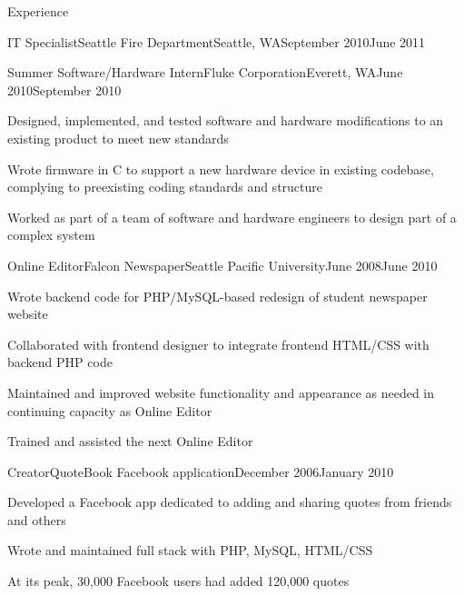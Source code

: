 \documentclass[letterpaper,10pt]{article}
\newcommand{\optarg}[2][]{%
  \ifthenelse{\isempty{#1}}%
    {}%
    {#2}%
}
\newenvironment{res_section}[1]{%
  \vskip 6pt
  \noindent
  {\Large \textbf{#1}}\\
  \rule[8pt]{\textwidth}{0.5pt}
  \vskip -8pt
}{
}
\newenvironment{res_subsection}[1]{%
  \vskip 4pt
  \noindent
  \textbf{\large{#1}}
  \begin{itemize}
}{
  \end{itemize}
}
\newenvironment{res_experienceitem}[5]{%
  \begin{res_subsection}{#1 - \em{%
  #2%
  \optarg[#3]{, #3}%
  \optarg[#4]{, #4}%
  \optarg[#5]{ -- #5}%
  }}
}{
  \end{res_subsection}
}
\begin{document}
\begin{res_section}{Experience}
\begin{res_experienceitem}{IT Specialist}{Seattle Fire Department}{Seattle, WA}{September 2010}{June 2011}
\end{res_experienceitem}
\begin{res_experienceitem}{Summer Software/Hardware Intern}{Fluke Corporation}{Everett, WA}{June 2010}{September 2010}
  \item Designed, implemented, and tested software and hardware modifications to an existing product to meet new standards
  \item Wrote firmware in C to support a new hardware device in existing codebase, complying to preexisting coding standards and structure
  \item Worked as part of a team of software and hardware engineers to design part of a complex system
\end{res_experienceitem}
\begin{res_experienceitem}{Online Editor}{Falcon Newspaper}{Seattle Pacific University}{June 2008}{June 2010}
  \item Wrote backend code for PHP/MySQL-based redesign of student newspaper website
  \item Collaborated with frontend designer to integrate frontend HTML/CSS with backend PHP code
  \item Maintained and improved website functionality and appearance as needed in continuing capacity as Online Editor
  \item Trained and assisted the next Online Editor
\end{res_experienceitem}
\begin{res_experienceitem}{Creator}{QuoteBook Facebook application}{}{December 2006}{January 2010}
  \item Developed a Facebook app dedicated to adding and sharing quotes from friends and others
  \item Wrote and maintained full stack with PHP, MySQL, HTML/CSS
  \item At its peak, 30,000 Facebook users had added 120,000 quotes
\end{res_experienceitem}
\end{res_section}
\end{document}
